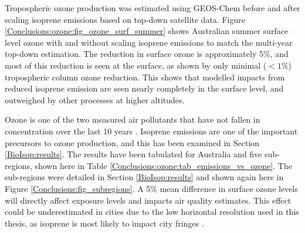   
  Tropospheric ozone production was estimated using GEOS-Chem before and after scaling isoprene emissions based on top-down satellite data.
  Figure \ref{Conclusions:ozone:fig_ozone_surf_summer} shows Australian summer surface level ozone with and without scaling isoprene emissions to match the multi-year top-down estimation.
  The reduction in surface ozone is approximately 5\%, and most of this reduction is seen at the surface, as shown by only minimal ($<1\%$) tropospheric column ozone reduction.
  This shows that modelled impacts from reduced isoprene emission are seen nearly completely in the surface level, and outweighed by other processes at higher altitudes.
  
  
  Ozone is one of the two measured air pollutants that have not fallen in concentration over the last 10 years \parencite{SOE2016}.
  Isoprene emissions are one of the important precursors to ozone production, and this has been examined in Section \ref{BioIsop:results}.
  The results have been tabulated for Australia and five sub-regions, shown here in Table \ref{Conclusions:ozone:tab_emissions_vs_ozone}.
  The sub-regions were detailed in Section \ref{BioIsop:results} and shown again here in Figure \ref{Conclusions:fig_subregions}. 
  A 5\% mean difference in surface ozone levels will directly affect exposure levels and impacts air quality estimates. 
  This effect could be underestimated in cities due to the low horizontal resolution used in this thesis, as isoprene is most likely to impact city fringes \parencite{Millet2016}.
  
